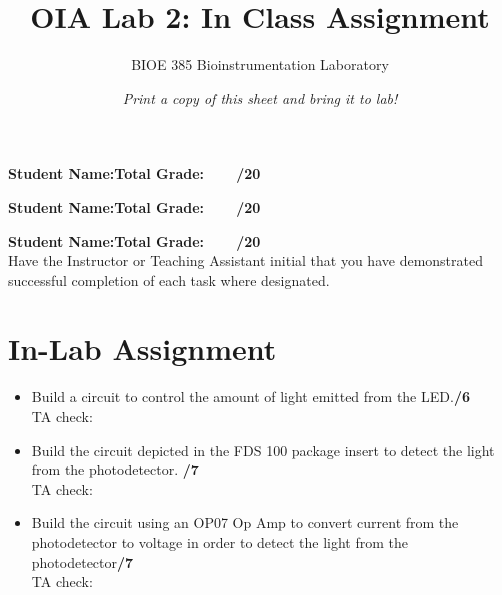 \documentclass{article}
\title{OIA Lab 2: In Class Assignment}
\author{BIOE 385 Bioinstrumentation Laboratory}
\date{\textit{Print a copy of this sheet and bring it to lab!}}
\begin{document}
\large
\maketitle

\textbf{Student Name:}\hfill 	\textbf{Total Grade:\ \ \ \ /20}\vspace{0.5cm}

\textbf{Student Name:}\hfill 	\textbf{Total Grade:\ \ \ \ /20}\vspace{0.5cm}

\textbf{Student Name:}\hfill 	\textbf{Total Grade:\ \ \ \ /20}\\

Have the Instructor or Teaching Assistant initial that you have demonstrated successful completion of each task where designated.

\section*{In-Lab Assignment}
\begin{itemize}
	\item Build a circuit to control the amount of light emitted from the LED.\hfill \textbf{\underline{\hspace{1cm}}/6}\\TA check: \underline{\hspace{2cm}}\\
	\item Build the circuit depicted in the FDS 100 package insert to detect the light from the photodetector. \hfill \textbf{\underline{\hspace{1cm}}/7}\\TA check: \underline{\hspace{2cm}}\\
	\item Build the circuit using an OP07 Op Amp to convert current from the photodetector to voltage in order to detect the light from the photodetector\hfill \textbf{\underline{\hspace{1cm}}/7}\\TA check: \underline{\hspace{2cm}}
\end{itemize}
\end{document}
